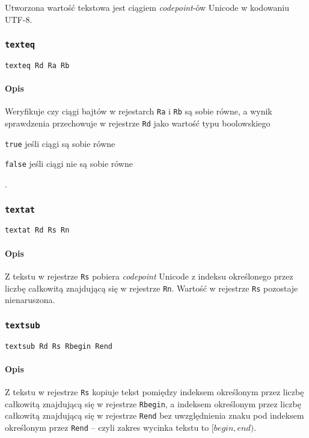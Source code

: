 Utworzona wartość tekstowa jest ciągiem \emph{codepoint}-ów Unicode w kodowaniu UTF-8.

\subsubsection{\texttt{texteq}}

\begin{lstlisting}
texteq Rd Ra Rb
\end{lstlisting}

\paragraph*{Opis} Weryfikuje czy ciągi bajtów w rejestarch \texttt{Ra} i
\texttt{Rb} są sobie równe, a wynik sprawdzenia przechowuje w rejestrze
\texttt{Rd} jako wartość typu boolowskiego
\begin{enumerate*}[label=(\arabic*)]
    \item \texttt{true} jeśli ciągi są sobie równe
    \item \texttt{false} jeśli ciągi nie są sobie równe
\end{enumerate*}.

\subsubsection{\texttt{textat}}

\begin{lstlisting}
textat Rd Rs Rn
\end{lstlisting}

\paragraph*{Opis} Z tekstu w rejestrze \texttt{Rs} pobiera \emph{codepoint}
Unicode z indeksu określonego przez liczbę całkowitą znajdującą się w rejestrze
\texttt{Rn}. Wartość w rejestrze \texttt{Rs} pozostaje nienaruszona.

\subsubsection{\texttt{textsub}}

\begin{lstlisting}
textsub Rd Rs Rbegin Rend
\end{lstlisting}

\paragraph*{Opis} Z tekstu w rejestrze \texttt{Rs} kopiuje tekst pomiędzy
indeksem określonym przez liczbę całkowitą znajdującą się w rejestrze
\texttt{Rbegin}, a indeksem określonym przez liczbę całkowitą znajdującą się w
rejestrze \texttt{Rend} bez uwzględnienia znaku pod indeksem określonym przez
\texttt{Rend} -- czyli zakres wycinka tekstu to $[begin, end)$.

